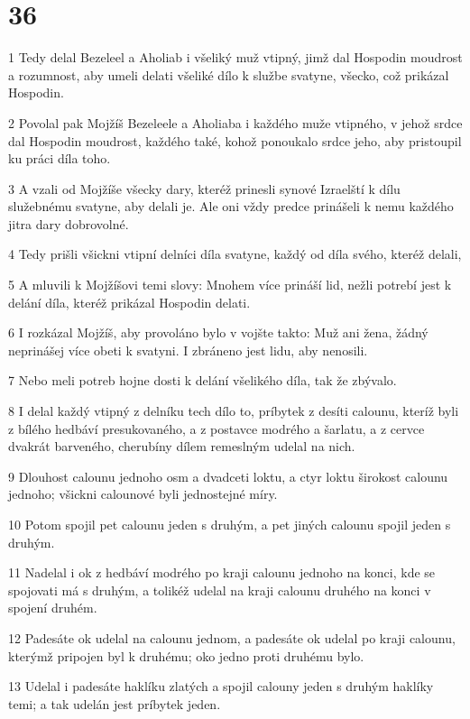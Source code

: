 \chapter{36}

\par 1 Tedy delal Bezeleel a Aholiab i všeliký muž vtipný, jimž dal Hospodin moudrost a rozumnost, aby umeli delati všeliké dílo k službe svatyne, všecko, což prikázal Hospodin.
\par 2 Povolal pak Mojžíš Bezeleele a Aholiaba i každého muže vtipného, v jehož srdce dal Hospodin moudrost, každého také, kohož ponoukalo srdce jeho, aby pristoupil ku práci díla toho.
\par 3 A vzali od Mojžíše všecky dary, kteréž prinesli synové Izraelští k dílu služebnému svatyne, aby delali je. Ale oni vždy predce prinášeli k nemu každého jitra dary dobrovolné.
\par 4 Tedy prišli všickni vtipní delníci díla svatyne, každý od díla svého, kteréž delali,
\par 5 A mluvili k Mojžíšovi temi slovy: Mnohem více prináší lid, nežli potrebí jest k delání díla, kteréž prikázal Hospodin delati.
\par 6 I rozkázal Mojžíš, aby provoláno bylo v vojšte takto: Muž ani žena, žádný neprinášej více obeti k svatyni. I zbráneno jest lidu, aby nenosili.
\par 7 Nebo meli potreb hojne dosti k delání všelikého díla, tak že zbývalo.
\par 8 I delal každý vtipný z delníku tech dílo to, príbytek z desíti calounu, kteríž byli z bílého hedbáví presukovaného, a z postavce modrého a šarlatu, a z cervce dvakrát barveného, cherubíny dílem remeslným udelal na nich.
\par 9 Dlouhost calounu jednoho osm a dvadceti loktu, a ctyr loktu širokost calounu jednoho; všickni calounové byli jednostejné míry.
\par 10 Potom spojil pet calounu jeden s druhým, a pet jiných calounu spojil jeden s druhým.
\par 11 Nadelal i ok z hedbáví modrého po kraji calounu jednoho na konci, kde se spojovati má s druhým, a tolikéž udelal na kraji calounu druhého na konci v spojení druhém.
\par 12 Padesáte ok udelal na calounu jednom, a padesáte ok udelal po kraji calounu, kterýmž pripojen byl k druhému; oko jedno proti druhému bylo.
\par 13 Udelal i padesáte haklíku zlatých a spojil calouny jeden s druhým haklíky temi; a tak udelán jest príbytek jeden.
